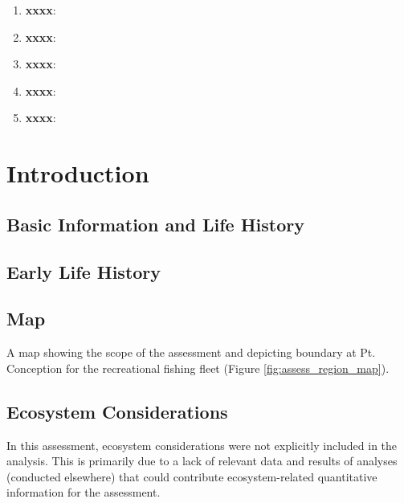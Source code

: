 \documentclass[12pt,]{article}
\begin{document}
\begin{enumerate}

\item \textbf{xxxx}: 

\item \textbf{xxxx}:

\item \textbf{xxxx}:

\item \textbf{xxxx}:

\item \textbf{xxxx}:

\end{enumerate}

\FloatBarrier

\newpage

\renewcommand{\thefigure}{\arabic{figure}}
\renewcommand{\thetable}{\arabic{table}}

\setcounter{figure}{0} \setcounter{table}{0}


\section{Introduction}\label{introduction}

\subsection{Basic Information and Life
History}\label{basic-information-and-life-history}

\subsection{Early Life History}\label{early-life-history}

\subsection{Map}\label{map}

A map showing the scope of the assessment and depicting boundary at Pt.
Conception for the recreational fishing fleet (Figure
\ref{fig:assess_region_map}).

\subsection{Ecosystem Considerations}\label{ecosystem-considerations-1}

In this assessment, ecosystem considerations were not explicitly
included in the analysis. This is primarily due to a lack of relevant
data and results of analyses (conducted elsewhere) that could contribute
ecosystem-related quantitative information for the assessment.
\end{document}
